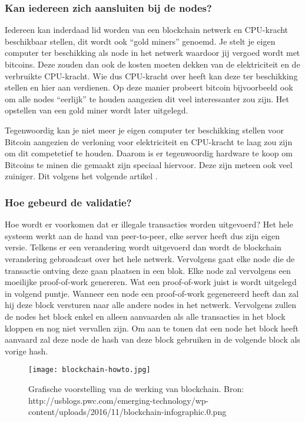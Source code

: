 \subsubsection{Kan iedereen zich aansluiten bij de nodes?}
 Iedereen kan inderdaad lid worden van een blockchain netwerk en CPU-kracht beschikbaar stellen, dit wordt ook ``gold miners'' genoemd. Je stelt je eigen computer ter beschikking als node in het netwerk waardoor jij vergoed wordt met bitcoins. Deze zouden dan ook de kosten moeten dekken van de elektriciteit en de verbruikte CPU-kracht. Wie dus CPU-kracht over heeft kan deze ter beschikking stellen en hier aan verdienen. Op deze manier probeert  bitcoin bijvoorbeeld ook om alle nodes ``eerlijk'' te houden aangezien dit veel interessanter zou zijn. Het opstellen van een gold miner wordt later uitgelegd. 
 
 Tegenwoordig kan je niet meer je eigen computer ter beschikking stellen voor Bitcoin aangezien de verloning voor elektriciteit en CPU-kracht te laag zou zijn om dit competetief te houden. Daarom is er tegenwoordig hardware te koop om Bitcoins te minen die gemaakt zijn speciaal hiervoor. Deze zijn meteen ook veel zuiniger. Dit volgens het volgende artikel \textcite{Bitcoinmining.com}.
 
 \subsubsection{Hoe gebeurd de validatie?}
 Hoe wordt er voorkomen dat er illegale transacties worden uitgevoerd? Het hele systeem werkt aan de hand van peer-to-peer, elke server heeft dus zijn eigen versie. Telkens er een verandering wordt uitgevoerd dan wordt de blockchain verandering gebroadcast over het hele netwerk. Vervolgens gaat elke node die de transactie ontving deze gaan plaatsen in een blok. Elke node zal vervolgens een moeilijke proof-of-work genereren. Wat een proof-of-work juist is wordt uitgelegd in volgend puntje. Wanneer een node een proof-of-work gegenereerd heeft dan zal hij deze block versturen naar alle andere nodes in het netwerk. Vervolgens zullen de nodes het block enkel en alleen aanvaarden als alle transacties in het block kloppen en nog niet vervallen zijn. Om aan te tonen dat een node het block heeft aanvaard zal deze node de hash van deze block gebruiken in de volgende block als vorige hash. 

\begin{figure}
	\texttt{[image: blockchain-howto.jpg]}
	\caption{Grafische voorstelling van de werking van blockchain. Bron: http://usblogs.pwc.com/emerging-technology/wp-content/uploads/2016/11/blockchain-infographic.0.png}
	\label{fig:blockchain-howto}
\end{figure}

